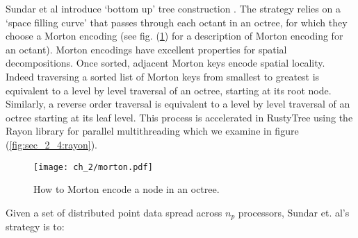 Sundar et al introduce `bottom up' tree construction \cite{sundar2008bottom}. The strategy relies on a `space filling curve' that passes through each octant in an octree, for which they choose a Morton encoding (see fig. (\ref{fig:sec_2_4:morton}) for a description of Morton encoding for an octant). Morton encodings have excellent properties for spatial decompositions. Once sorted, adjacent Morton keys encode spatial locality. Indeed traversing a sorted list of Morton keys from smallest to greatest is equivalent to a level by level traversal of an octree, starting at its root node. Similarly, a reverse order traversal is equivalent to a level by level traversal of an octree starting at its leaf level. This process is accelerated in RustyTree using the Rayon library for parallel multithreading which we examine in figure (\ref{fig:sec_2_4:rayon}).


\begin{figure}
    \centerline{\texttt{[image: ch\_2/morton.pdf]}}
    \caption{How to Morton encode a node in an octree.}
    \label{fig:sec_2_4:morton}
\end{figure}

Given a set of distributed point data spread across $n_p$ processors, Sundar et. al's strategy is to:

